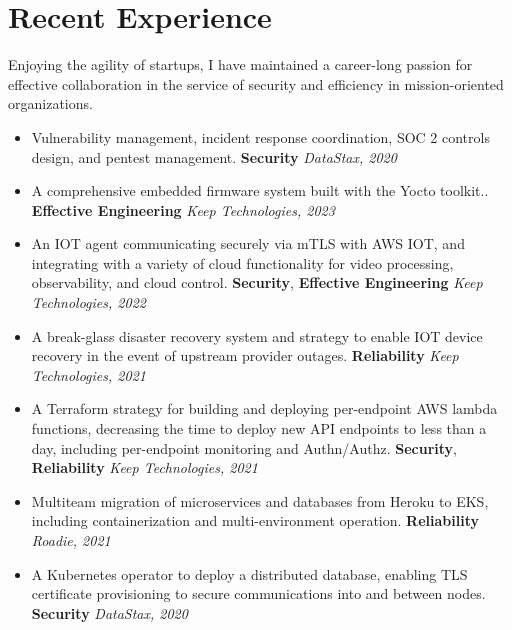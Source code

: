 \documentclass[letterpaper,10pt]{article}
\begin{document}

\section{Recent Experience}
Enjoying the agility of startups, I have maintained a
career-long passion for effective collaboration in the service of security and efficiency in mission-oriented organizations.
\begin{itemize}
	\item Vulnerability management, incident response coordination, SOC 2 controls design, and pentest management. \textbf{Security} \textit{DataStax, 2020}
	\setlength\itemsep{0.1em} \item A comprehensive embedded firmware system
	      built with the Yocto toolkit.. \textbf{Effective Engineering} \textit{Keep Technologies, 2023}
	\item An IOT agent communicating securely via mTLS with AWS IOT, and integrating with a variety of cloud functionality for video processing, observability, and cloud control. \textbf{Security}, \textbf{Effective Engineering} \textit{Keep Technologies, 2022}
	\item A break-glass disaster recovery system and strategy to enable IOT device recovery in the event of upstream provider outages. \textbf{Reliability} \textit{Keep Technologies, 2021}
	\item A Terraform strategy for building and deploying per-endpoint AWS lambda functions, decreasing the time to deploy new API endpoints to less than a day, including per-endpoint monitoring and Authn/Authz. \textbf{Security}, \textbf{Reliability} \textit{Keep Technologies, 2021}
	\item Multiteam migration of microservices and databases from Heroku to EKS, including containerization and multi-environment operation. \textbf{Reliability} \textit{Roadie, 2021}
	\item A Kubernetes operator to deploy a distributed database, enabling TLS certificate provisioning to secure communications into and between nodes. \textbf{Security} \textit{DataStax, 2020}
\end{itemize}
\end{document}
